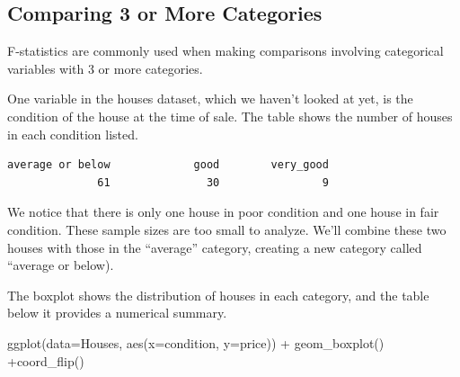\documentclass[
  letterpaper,
  DIV=11,
  numbers=noendperiod]{scrreprt}
\newenvironment{Shaded}{\begin{snugshade}}{\end{snugshade}}
\newcommand{\AttributeTok}[1]{\textcolor[rgb]{0.40,0.45,0.13}{#1}}
\newcommand{\FunctionTok}[1]{\textcolor[rgb]{0.28,0.35,0.67}{#1}}
\newcommand{\NormalTok}[1]{\textcolor[rgb]{0.00,0.23,0.31}{#1}}
\newcommand{\OtherTok}[1]{\textcolor[rgb]{0.00,0.23,0.31}{#1}}
\newcommand{\SpecialCharTok}[1]{\textcolor[rgb]{0.37,0.37,0.37}{#1}}
\newcommand{\StringTok}[1]{\textcolor[rgb]{0.13,0.47,0.30}{#1}}
\begin{document}
\subsection{Comparing 3 or More
Categories}\label{comparing-3-or-more-categories}

F-statistics are commonly used when making comparisons involving
categorical variables with 3 or more categories.

One variable in the houses dataset, which we haven't looked at yet, is
the condition of the house at the time of sale. The table shows the
number of houses in each condition listed.

\begin{Shaded}
\end{Shaded}

\begin{verbatim}
average or below             good        very_good 
              61               30                9 
\end{verbatim}

We notice that there is only one house in poor condition and one house
in fair condition. These sample sizes are too small to analyze. We'll
combine these two houses with those in the ``average'' category,
creating a new category called ``average or below).

\begin{Shaded}
\end{Shaded}

The boxplot shows the distribution of houses in each category, and the
table below it provides a numerical summary.

\begin{Shaded}
\begin{Highlighting}[]
\FunctionTok{ggplot}\NormalTok{(}\AttributeTok{data=}\NormalTok{Houses, }\FunctionTok{aes}\NormalTok{(}\AttributeTok{x=}\NormalTok{condition, }\AttributeTok{y=}\NormalTok{price)) }\SpecialCharTok{+} \FunctionTok{geom\_boxplot}\NormalTok{() }\SpecialCharTok{+}\FunctionTok{coord\_flip}\NormalTok{()}
\end{Highlighting}
\end{Shaded}
\end{document}

